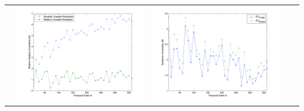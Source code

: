 \documentclass[11pt]{article}
\begin{document}
\begin{table}[H]
{\begin{tabular}{c  c   c   c  c }
&\begin{minipage}{.4\textwidth}\includegraphics[width=\linewidth]{resultgraph/06892000AU.png}\end{minipage}
&\begin{minipage}{.4\textwidth}\includegraphics[width=\linewidth]{resultgraph/06892000EU.png}\end{minipage}
\\

\end{tabular}}
\end{table}
\end{document}
